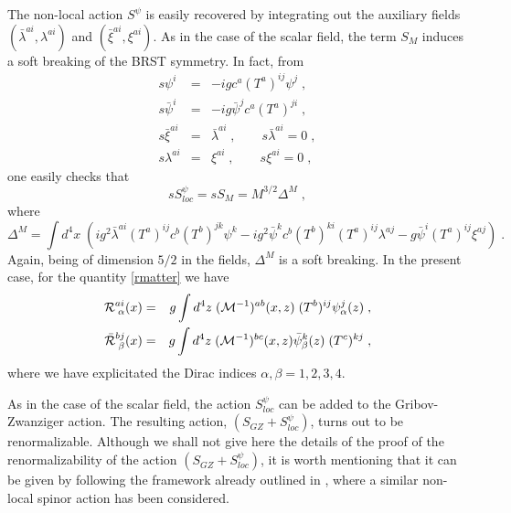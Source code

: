 The non-local action $S^{\psi}$ is easily recovered by integrating out the auxiliary fields $({\bar \lambda}^{ai}, {\lambda}^{ai})$ and $({\bar \xi}^{ai}, {\xi}^{ai})$. As in the case of the scalar field, the term $S_M$ induces a soft breaking of the BRST symmetry. In fact, from 
\begin{eqnarray}
s \psi^{i} & = & -ig c^a (T^a)^{ij} \psi^{j} \;, \nonumber \\
s {\bar \psi}^{i} & = & -ig {\bar \psi}^{j} c^a (T^a)^{ji} \;, \nonumber \\
s {\bar \xi}^{ai} & = & {\bar \lambda}^{ai} \;, \qquad s {\bar \lambda}^{ai} = 0\;, \nonumber \\
s {\lambda}^{ai} & = & {\xi}^{ai} \;, \qquad s{\xi}^{ai}=0 \;,  \label{spsi}
\end{eqnarray}
one easily checks that 
\begin{equation}
s S^{\psi}_{loc} = s  S_M = M^{3/2}  \Delta^M   \;, \label{sbM} 
\end{equation}
where
\begin{equation}
\Delta^M = \int d^4x \; \left(  ig^2  {\bar \lambda}^{ai} (T^a)^{ij} c^b (T^b)^{jk}\psi^{k} -ig^2 {\bar \psi}^{k} c^b (T^b)^{ki}(T^a)^{ij} \lambda^{aj}  
- g {\bar \psi}^{i} (T^a)^{ij} \xi^{aj}   \right)   \;. \label{dm}
\end{equation}
Again, being of dimension $5/2$ in the fields, $\Delta^M$ is a soft breaking. In the present case, for the quantity  \eqref{rmatter} we have 
\begin{eqnarray}
{\cal R}^{ai}_{\;\alpha} (x)  & = &  g \int d^4z\;  ({\cal M}^{-1})^{ab} (x,z)   \;(T^b)^{ij} \psi^{j}_{\alpha} (z)     \;, \nonumber \\
{\bar {\cal R}}^{bj}_{\;\beta} (x)  & = &  g \int d^4z\;  ({\cal M}^{-1})^{bc } (x,z)  {\bar \psi}^{k}_{\beta}(z)  \;(T^c)^{kj}     \;, \label{rpsi}
\end{eqnarray}
where we have explicitated  the Dirac indices $\alpha,\beta=1,2,3,4$. 

As in the case of the scalar field, the action $S^{\psi}_{loc} $ can be added to the Gribov-Zwanziger action. The resulting action, $(S_{GZ} + S^{\psi}_{loc})$, turns out to be renormalizable. Although we shall not give here the details of the proof of the renormalizability of the action $(S_{GZ} + S^{\psi}_{loc})$, it is worth mentioning that it can be given by following the framework already outlined in \cite{Baulieu:2009xr}, where a similar non-local spinor action has been considered. 

